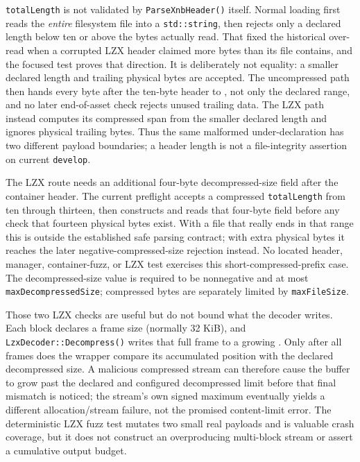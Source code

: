 \texttt{totalLength} is not validated by \texttt{ParseXnbHeader()} itself. Normal
 loading first reads the \emph{entire} filesystem file into a
\texttt{std::string}, then rejects only a declared length below ten or above the bytes actually
read. That fixed the historical over-read when a corrupted LZX header claimed more bytes than its
file contains, and the focused test proves that direction. It is deliberately not equality:
a smaller declared length and trailing physical bytes are accepted. The uncompressed path then
hands every byte after the ten-byte header to , not only the declared
range, and no later end-of-asset check rejects unused trailing data. The LZX path instead computes
its compressed span from the smaller declared length and ignores physical trailing bytes. Thus the
same malformed under-declaration has two different payload boundaries; a header length is not a
file-integrity assertion on current \texttt{develop}.

The LZX route needs an additional four-byte decompressed-size field after the container header.
The current preflight accepts a compressed \texttt{totalLength} from ten through thirteen, then
constructs and reads that four-byte field before any check that fourteen physical bytes exist.
With a file that really ends in that range this is outside the established safe parsing contract;
with extra physical bytes it reaches the later negative-compressed-size rejection instead. No
located header, manager, container-fuzz, or LZX test exercises this short-compressed-prefix case.
The decompressed-size value is required to be nonnegative and at most
\texttt{maxDecompressedSize}; compressed bytes are separately limited by \texttt{maxFileSize}.

Those two LZX checks are useful but do not bound what the decoder writes. Each block declares a
frame size (normally 32 KiB), and \texttt{LzxDecoder::Decompress()} writes that full frame to a
growing . Only after all frames does the wrapper compare its accumulated
position with the declared decompressed size. A malicious compressed stream can therefore cause
the buffer to grow past the declared and configured decompressed limit before that final mismatch
is noticed; the stream's own signed maximum eventually yields a different allocation/stream
failure, not the promised content-limit error. The deterministic LZX fuzz test mutates two small
real payloads and is valuable crash coverage, but it does not construct an overproducing
multi-block stream or assert a cumulative output budget.

